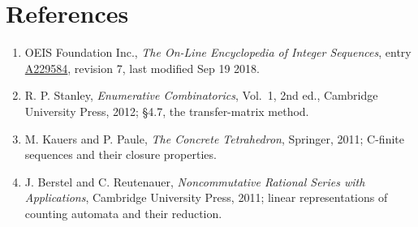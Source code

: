 \documentclass[11pt]{article}
\theoremstyle{definition}
\begin{document}
\section{References}

\begin{enumerate}

\item OEIS Foundation Inc., \emph{The On-Line Encyclopedia of Integer Sequences}, entry \href{https://oeis.org/A229584}{A229584}, revision 7, last modified Sep 19 2018.

\item R. P. Stanley, \emph{Enumerative Combinatorics}, Vol.~1, 2nd ed., Cambridge University Press, 2012; \S4.7, the transfer-matrix method.

\item M. Kauers and P. Paule, \emph{The Concrete Tetrahedron}, Springer, 2011; C-finite sequences and their closure properties.

\item J. Berstel and C. Reutenauer, \emph{Noncommutative Rational Series with Applications}, Cambridge University Press, 2011; linear representations of counting automata and their reduction.

\end{enumerate}
\end{document}
